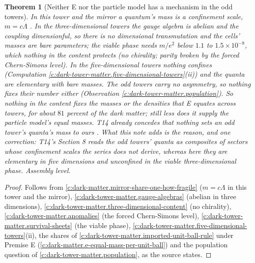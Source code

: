\documentclass[11pt]{article}
\newtheorem{theorem}{Theorem}[section]
\theoremstyle{definition}
\theoremstyle{plain}
\newcommand{\changedmark}[2]{\marginpar{\raggedright\scriptsize\color{#1}#2}}
\begin{document}
\begin{theorem}[Neither E nor the particle model has a mechanism in the odd towers]\label{c:dark-tower-matter.r1-has-no-mechanism-odd-towers}
\changedmark{BurntOrange}{changed since the deposit}
In this tower and the mirror a quantum's mass is a confinement scale, $m = c\Lambda$ \cite[Prop.~4.7]{ButlerT14}. In the three-dimensional towers the gauge algebra is abelian and the coupling dimensionful, so there is no dimensional transmutation and the cells' masses are bare parameters; the viable phase needs $m/e^{2}$ below $1.1$ to $1.5 \times 10^{-8}$, which nothing in the content protects (no chirality; parity broken by the forced Chern-Simons level). In the five-dimensional towers nothing confines (Computation \ref{c:dark-tower-matter.five-dimensional-towers}(ii)) and the quanta are elementary with bare masses. The odd towers carry no asymmetry, so nothing fixes their number either (Observation \ref{c:dark-tower-matter.population}). So nothing in the content fixes the masses or the densities that E equates across towers, for about $81$ percent of the dark matter; still less does it supply the particle model's equal masses. T14 already concedes that nothing sets an odd tower's quanta's mass to ours \cite[Rem.~7.8, Sec.~8]{ButlerT14}. What this note adds is the reason, and one correction: T14's Section 8 reads the odd towers' quanta as composites of sectors whose confinement scales the series does not derive, whereas here they are elementary in five dimensions and unconfined in the viable three-dimensional phase. Assembly level.
\end{theorem}
\begin{proof}
Follows from \ref{c:dark-matter.mirror-share-one-how-fragile} ($m = c\Lambda$ in this tower and the mirror), \ref{c:dark-tower-matter.gauge-algebras} (abelian in three dimensions), \ref{c:dark-tower-matter.three-dimensional-content} (no chirality), \ref{c:dark-tower-matter.anomalies} (the forced Chern-Simons level), \ref{c:dark-tower-matter.survival-sheets} (the viable phase), \ref{c:dark-tower-matter.five-dimensional-towers}(ii), the shares of \ref{c:dark-tower-matter.imported-unit-ball-rule} under Premise E (\ref{c:dark-matter.e-equal-mass-per-unit-ball}) and the population question of \ref{c:dark-tower-matter.population}, as the source states.

\end{proof}
\end{document}
